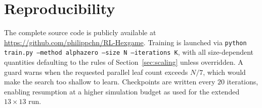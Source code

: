 \documentclass[conference]{IEEEtran}
\begin{document}
\section{Reproducibility}
\label{app:repro}
The complete source code is publicly available at
\url{https://github.com/philippchn/RL-Hexgame}.
Training is launched via \texttt{python train.py --method alphazero --size N
--iterations K}, with all size-dependent quantities defaulting to the rules of
Section~\ref{sec:scaling} unless overridden. A guard warns when the requested parallel
leaf count exceeds $N/7$, which would make the search too shallow to learn. Checkpoints are
written every $20$ iterations, enabling resumption at a higher simulation budget as used for
the extended $13\times13$ run.
\end{document}
